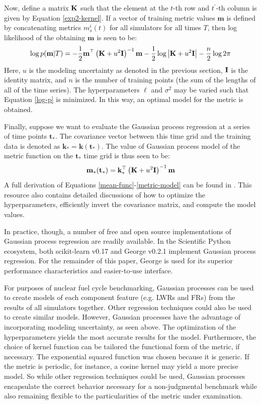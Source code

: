 Now, define a matrix $\mathbf{K}$ such that the element at the $t$-th row and $t^\prime$-th
column is given by Equation \ref{exp2-kernel}. If a vector of training metric 
values $\mathbf{m}$ is defined by concatenating metrics $m_s^i(t)$ for all 
simulators
for all times $T$, then log likelihood of the obtaining $\mathbf{m}$ 
is seen to be:
\begin{equation}
\label{log-p}
\log p(\mathbf{m}|T) = -\frac{1}{2}\mathbf{m}^\top\left(\mathbf{K} + u^2\mathbf{I}\right)^{-1}\mathbf{m}
                       -\frac{1}{2}\log\left|\mathbf{K} + u^2\mathbf{I}\right|
                       -\frac{n}{2}\log 2\pi
\end{equation}
Here, $u$ is the modeling uncertainty as denoted in the previous section, 
$\mathbf{I}$ is the identity matrix, and $n$ is the number of training points (the 
sum of the lengths of all of the time series). The hyperparameters $\ell$ and
$\sigma^2$ may be varied such that Equation \ref{log-p} is minimized. 
In this way, an optimal model for the metric is obtained.

Finally, suppose we want to evaluate the Gaussian process regression at a 
series of time points $\mathbf{t_*}$. 
The covariance vector between this time grid and the training data is denoted
as $\mathbf{k}_* = \mathbf{k}(\mathbf{t_*})$. The value of Gaussian process 
model of the metric function on the $\mathbf{t_*}$ time grid is thus seen to be:
\begin{equation}
\label{metric-model}
\mathbf{m}_*(\mathbf{t}_*) = \mathbf{k}_*^\top \left(\mathbf{K} + u^2\mathbf{I}\right)^{-1}\mathbf{m}
\end{equation}
A full derivation of Equations \ref{mean-func}-\ref{metric-model} can be found in 
\cite{rasmussen2006gaussian}. This resource also contains detailed discussions of 
how to optimize the hyperparameters, efficiently invert the covariance 
matrix, and compute the model values. 

In practice, though, a number of free and open source implementations of Gaussian 
process regression are readily available. In the Scientific Python ecosystem, both 
scikit-learn v0.17 \cite{scikit-learn} and George v0.2.1 \cite{hodlr} implement 
Gaussian process regression. For the remainder of this paper, George is used
for its superior performance characteristics and easier-to-use interface.

For purposes of nuclear fuel cycle benchmarking, Gaussian processes can be used to
create models of each component feature (e.g. LWRs and FRs) from the 
results of all simulators together. Other regression techniques could also be used 
to create similar models.  However, Gaussian processes have the advantage of 
incorporating modeling uncertainty, as seen above. The optimization of the 
hyperparameters yields the most accurate results for the model. Furthermore, the 
choice of kernel function can be tailored the functional form of the metric, if 
necessary. The exponential squared function was chosen because it is generic. If the 
metric is periodic, for instance, a cosine kernel may yield a more precise model. 
So while other regression techniques could be used, Gaussian processes 
encapsulate the correct behavior necessary for a non-judgmental benchmark while 
also remaining flexible to the particularities of the metric under examination.

